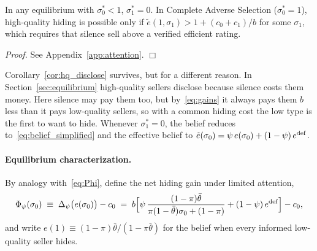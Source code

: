\begin{corollary}
\label{cor:att_hq}
In any equilibrium with $\sigma_0^*<1$, $\sigma_1^*=0$. In Complete Adverse Selection ($\sigma_0^*=1$), high-quality hiding is possible only if $\tilde e(1,\sigma_1)>1+(c_0+c_1)/b$ for some $\sigma_1$, which requires that silence sell above a verified efficient rating.
\end{corollary}

\noindent\textit{Proof.} See Appendix~\ref{app:attention}. $\Box$

Corollary~\ref{cor:hq_disclose} survives, but for a different reason. In Section~\ref{sec:equilibrium} high-quality sellers disclose because silence costs them money. Here silence may pay them too, but by~\eqref{eq:gains} it always pays them $b$ less than it pays low-quality sellers, so with a common hiding cost the low type is the first to want to hide. Whenever $\sigma_1^*=0$, the belief reduces to~\eqref{eq:belief_simplified} and the effective belief to $\tilde e(\sigma_0)=\psi\,e(\sigma_0)+(1-\psi)\,e^{\rm def}$.

\paragraph{Equilibrium characterization.}
By analogy with~\eqref{eq:Phi}, define the net hiding gain under limited attention,
\begin{equation}
    \Phi_\psi(\sigma_0)\;\equiv\;\Delta_\psi\big(e(\sigma_0)\big)-c_0\;=\;b\Big[\psi\,\frac{(1-\pi)\bar\theta}{\pi(1-\bar\theta)\sigma_0+(1-\pi)}+(1-\psi)\,e^{\rm def}\Big]-c_0,
    \label{eq:Phi_psi}
\end{equation}
and write $e(1)\equiv(1-\pi)\bar\theta/(1-\pi\bar\theta)$ for the belief when every informed low-quality seller hides.

